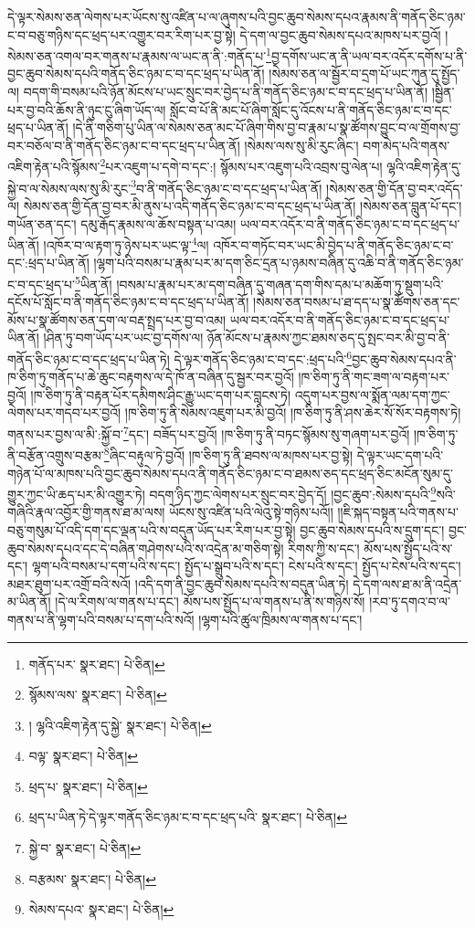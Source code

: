 དེ་ལྟར་སེམས་ཅན་ལེགས་པར་ཡོངས་སུ་འཛིན་པ་ལ་ཞུགས་པའི་བྱང་ཆུབ་སེམས་དཔའ་རྣམས་ནི་གནོད་ཅིང་ཉམ་ང་བ་བཅུ་གཉིས་དང་ཕྲད་པར་འགྱུར་བར་རིག་པར་བྱ་སྟེ། དེ་དག་ལ་བྱང་ཆུབ་སེམས་དཔའ་མཁས་པར་བྱའོ། །སེམས་ཅན་འགལ་བར་གནས་པ་རྣམས་ལ་ཡང་ན་ནི་:གནོད་པ་\footnote{གནོད་པར་  སྣར་ཐང་།  པེ་ཅིན། }བྱ་དགོས་ཡང་ན་ནི་ཡལ་བར་འདོར་དགོས་པ་ནི་བྱང་ཆུབ་སེམས་དཔའི་གནོད་ཅིང་ཉམ་ང་བ་དང་ཕྲད་པ་ཡིན་ནོ། །སེམས་ཅན་ལ་སྦྱོར་བ་དྲག་པོ་ཡང་ཀུན་དུ་སྤྱོད་ལ། བདག་གི་བསམ་པའི་ཉོན་མོངས་པ་ཡང་སྲུང་བར་བྱེད་པ་ནི་གནོད་ཅིང་ཉམ་ང་བ་དང་ཕྲད་པ་ཡིན་ནོ། །སྦྱིན་པར་བྱ་བའི་ཆོས་ནི་ཉུང་ངུ་ཞིག་ཡོད་ལ། སློང་བ་པོ་ནི་མང་པོ་ཞིག་སློང་དུ་འོངས་པ་ནི་གནོད་ཅིང་ཉམ་ང་བ་དང་ཕྲད་པ་ཡིན་ནོ། །དེ་ནི་གཅིག་པུ་ཡིན་ལ་སེམས་ཅན་མང་པོ་ཞིག་གིས་བྱ་བ་རྣམ་པ་སྣ་ཚོགས་བྱུང་བ་ལ་གྲོགས་བྱ་བར་བཅོལ་བ་ནི་གནོད་ཅིང་ཉམ་ང་བ་དང་ཕྲད་པ་ཡིན་ནོ། །སེམས་ལས་སུ་མི་རུང་ཞིང་། བག་མེད་པའི་གནས་འཇིག་རྟེན་པའི་སྙོམས་\footnote{སྙོམས་ལས་  སྣར་ཐང་།  པེ་ཅིན། }པར་འཇུག་པ་དགེ་བ་དང་:། སྙོམས་པར་འཇུག་པའི་འབྲས་བུ་ལེན་པ། ལྷའི་འཇིག་རྟེན་དུ་སྐྱེ་བ་ལ་སེམས་ལས་སུ་མི་རུང་\footnote{།  ལྷའི་འཇིག་རྟེན་དུ་སྐྱེ་  སྣར་ཐང་།  པེ་ཅིན། }བ་ནི་གནོད་ཅིང་ཉམ་ང་བ་དང་ཕྲད་པ་ཡིན་ནོ། །སེམས་ཅན་གྱི་དོན་བྱ་བར་འདོད་ལ། སེམས་ཅན་གྱི་དོན་བྱ་བར་མི་ནུས་པ་འདི་གནོད་ཅིང་ཉམ་ང་བ་དང་ཕྲད་པ་ཡིན་ནོ། །སེམས་ཅན་བླུན་པོ་དང་། གཡོན་ཅན་དང་། དམུ་རྒོད་རྣམས་ལ་ཆོས་བསྟན་པ་འམ། ཡལ་བར་འདོར་བ་ནི་གནོད་ཅིང་ཉམ་ང་བ་དང་ཕྲད་པ་ཡིན་ནོ། །འཁོར་བ་ལ་རྟག་ཏུ་ཉེས་པར་ཡང་ལྟ་\footnote{བལྟ་  སྣར་ཐང་།  པེ་ཅིན། }ལ། འཁོར་བ་གཏོང་བར་ཡང་མི་བྱེད་པ་ནི་གནོད་ཅིང་ཉམ་ང་བ་དང་:ཕྲད་པ་ཡིན་ནོ། །ལྷག་པའི་བསམ་པ་རྣམ་པར་མ་དག་ཅིང་དྲན་པ་ཉམས་བཞིན་དུ་འཆི་བ་ནི་གནོད་ཅིང་ཉམ་ང་བ་དང་ཕྲད་པ་\footnote{ཕྲད་པ་  སྣར་ཐང་།  པེ་ཅིན། }ཡིན་ནོ། །བསམ་པ་རྣམ་པར་མ་དག་བཞིན་དུ་གཞན་དག་གིས་དམ་པ་མཆོག་ཏུ་སྡུག་པའི་དངོས་པོ་སློང་བ་ནི་གནོད་ཅིང་ཉམ་ང་བ་དང་ཕྲད་པ་ཡིན་ནོ། །སེམས་ཅན་བསམ་པ་ཐ་དད་པ་སྣ་ཚོགས་ཅན་དང་མོས་པ་སྣ་ཚོགས་ཅན་དག་ལ་བརྡ་སྤྲད་པར་བྱ་བ་འམ། ཡལ་བར་འདོར་བ་ནི་གནོད་ཅིང་ཉམ་ང་བ་དང་ཕྲད་པ་ཡིན་ནོ། །ཤིན་ཏུ་བག་ཡོད་པར་ཡང་བྱ་དགོས་ལ། ཉོན་མོངས་པ་རྣམས་ཀྱང་ཐམས་ཅད་དུ་སྤང་བར་མི་བྱ་བ་ནི་གནོད་ཅིང་ཉམ་ང་བ་དང་ཕྲད་པ་ཡིན་ཏེ། དེ་ལྟར་གནོད་ཅིང་ཉམ་ང་བ་དང་:ཕྲད་པའི་\footnote{ཕྲད་པ་ཡིན་ཏེ་དེ་ལྟར་གནོད་ཅིང་ཉམ་ང་བ་དང་ཕྲད་པའི་  སྣར་ཐང་།  པེ་ཅིན། }བྱང་ཆུབ་སེམས་དཔའ་ནི་ཁ་ཅིག་ཏུ་གནོད་པ་ཆེ་ཆུང་བརྟགས་ལ་དེ་ཁོ་ན་བཞིན་དུ་སྦྱར་བར་བྱའོ། །ཁ་ཅིག་ཏུ་ནི་གང་ཟག་ལ་བརྟག་པར་བྱའོ། །ཁ་ཅིག་ཏུ་ནི་བརྟན་པོར་དམིགས་ཤིང་རྒྱུ་ཡང་དག་པར་བླངས་ཏེ། འདུག་པར་བྱས་ལ་སྨོན་ལམ་དག་ཀྱང་ལེགས་པར་གདབ་པར་བྱའོ། །ཁ་ཅིག་ཏུ་ནི་སེམས་འཇུག་པར་མི་བྱའོ། །ཁ་ཅིག་ཏུ་ནི་ཤས་ཆེར་སོ་སོར་བརྟགས་ཏེ། གནས་པར་བྱས་ལ་མི་:སྐྱོ་བ་\footnote{སྐྱེ་བ་  སྣར་ཐང་།  པེ་ཅིན། }དང་། བཟོད་པར་བྱའོ། །ཁ་ཅིག་ཏུ་ནི་བཏང་སྙོམས་སུ་གཞག་པར་བྱའོ། །ཁ་ཅིག་ཏུ་ནི་བརྩོན་འགྲུས་བརྩམ་\footnote{བརྩམས་  སྣར་ཐང་།  པེ་ཅིན། }ཞིང་བརྟུལ་ཏེ་བྱའོ། །ཁ་ཅིག་ཏུ་ནི་ཐབས་ལ་མཁས་པར་བྱ་སྟེ། དེ་ལྟར་ཡང་དག་པའི་གཉེན་པོ་ལ་མཁས་པའི་བྱང་ཆུབ་སེམས་དཔའ་ནི་གནོད་ཅིང་ཉམ་ང་བ་ཐམས་ཅད་དང་ཕྲད་ཅིང་མངོན་སུམ་དུ་གྱུར་ཀྱང་ཡི་ཆད་པར་མི་འགྱུར་ཏེ། བདག་ཉིད་ཀྱང་ལེགས་པར་སྲུང་བར་བྱེད་དོ། །བྱང་ཆུབ་:སེམས་དཔའི་\footnote{སེམས་དཔའ་  སྣར་ཐང་།  པེ་ཅིན། }སའི་གཞིའི་རྣལ་འབྱོར་གྱི་གནས་ཐ་མ་ལས། ཡོངས་སུ་འཛིན་པའི་ལེའུ་སྟེ་གཉིས་པའོ།། །།ཇི་སྐད་བསྟན་པའི་གནས་པ་བཅུ་གསུམ་པོ་འདི་དག་དང་ལྡན་པའི་ས་བདུན་ཡོད་པར་རིག་པར་བྱ་སྟེ། བྱང་ཆུབ་སེམས་དཔའི་ས་དྲུག་དང་། བྱང་ཆུབ་སེམས་དཔའ་དང་དེ་བཞིན་གཤེགས་པའི་ས་འདྲེན་མ་གཅིག་སྟེ། རིགས་ཀྱི་ས་དང་། མོས་པས་སྤྱོད་པའི་ས་དང་། ལྷག་པའི་བསམ་པ་དག་པའི་ས་དང་། སྤྱོད་པ་སྒྲུབ་པའི་ས་དང་། ངེས་པའི་ས་དང་། སྤྱོད་པ་ངེས་པའི་ས་དང་། མཐར་ཐུག་པར་འགྲོ་བའི་སའོ། །འདི་དག་ནི་བྱང་ཆུབ་སེམས་དཔའི་ས་བདུན་ཡིན་ཏེ། དེ་དག་ལས་ཐ་མ་ནི་འདྲེན་མ་ཡིན་ནོ། །དེ་ལ་རིགས་ལ་གནས་པ་དང་། མོས་པས་སྤྱོད་པ་ལ་གནས་པ་ནི་ས་གཉིས་སོ། །རབ་ཏུ་དགའ་བ་ལ་གནས་པ་ནི་ལྷག་པའི་བསམ་པ་དག་པའི་སའོ། །ལྷག་པའི་ཚུལ་ཁྲིམས་ལ་གནས་པ་དང་། 